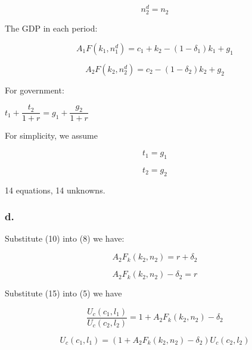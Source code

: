 \documentclass{article}
\begin{document}
\begin{equation}
    n^{d}_{2}=n_{2}
\end{equation}

The GDP in each period:

\begin{equation}
    A_{1}F\left(k_{1}, n^{d}_{1}\right)=c_{1}+k_{2}-\left(1-\delta_{1}\right)k_{1}+g_{1}
\end{equation}

\begin{equation}
    A_{2}F\left(k_{2}, n^{d}_{2}\right)=c_{2}-\left(1-\delta_{2}\right)k_{2}+g_{2}
\end{equation}

For government:

$t_{1}+\dfrac{t_{2}}{1+r}=g_{1}+\dfrac{g_{2}}{1+r}$

For simplicity, we assume

\begin{equation}
    t_{1}=g_{1}
\end{equation}

\begin{equation}
    t_{2}=g_{2}
\end{equation}

14 equations, 14 unknowns.

\subsubsection*{\textrm{d.}}

Substitute (10) into (8) we have:

\begin{equation*}
    A_{2}F_{k}\left(k_{2}, n_{2}\right)=r+\delta_{2}
\end{equation*}

\begin{equation}
    A_{2}F_{k}\left(k_{2}, n_{2}\right)-\delta_{2}=r 
\end{equation}

Substitute (15) into (5) we have

\begin{equation*}
    \dfrac{U_{c}\left(c_{1}, l_{1}\right)}{U_{c}\left(c_{2}, l_{2}\right)}=1+A_{2}F_{k}\left(k_{2}, n_{2}\right)-\delta_{2}
\end{equation*}

\begin{equation}
    U_{c}\left(c_{1}, l_{1}\right)=\left(1+A_{2}F_{k}\left(k_{2}, n_{2}\right)-\delta_{2}\right)U_{c}\left(c_{2}, l_{2}\right) 
\end{equation}
\end{document}
